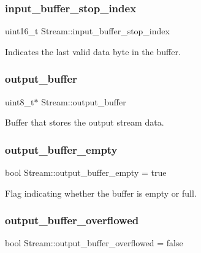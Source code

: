 \subsubsection{\texorpdfstring{input\+\_\+buffer\+\_\+stop\+\_\+index}{input\_buffer\_stop\_index}}
{\footnotesize\ttfamily uint16\+\_\+t Stream\+::input\+\_\+buffer\+\_\+stop\+\_\+index\hspace{0.3cm}{\ttfamily [protected]}}

Indicates the last valid data byte in the buffer. \hypertarget{class_stream_a3cd072a10ad5c1b6308dd2da2cdbec71}{}\label{class_stream_a3cd072a10ad5c1b6308dd2da2cdbec71} 
\subsubsection{\texorpdfstring{output\+\_\+buffer}{output\_buffer}}
{\footnotesize\ttfamily uint8\+\_\+t$\ast$ Stream\+::output\+\_\+buffer\hspace{0.3cm}{\ttfamily [protected]}}

Buffer that stores the output stream data. \hypertarget{class_stream_a54b21caaee0001e44968fb70d0a591f5}{}\label{class_stream_a54b21caaee0001e44968fb70d0a591f5} 
\subsubsection{\texorpdfstring{output\+\_\+buffer\+\_\+empty}{output\_buffer\_empty}}
{\footnotesize\ttfamily bool Stream\+::output\+\_\+buffer\+\_\+empty = true\hspace{0.3cm}{\ttfamily [protected]}}

Flag indicating whether the buffer is empty or full. \hypertarget{class_stream_a149776fead5c56894699da5bfe489b65}{}\label{class_stream_a149776fead5c56894699da5bfe489b65} 
\subsubsection{\texorpdfstring{output\+\_\+buffer\+\_\+overflowed}{output\_buffer\_overflowed}}
{\footnotesize\ttfamily bool Stream\+::output\+\_\+buffer\+\_\+overflowed = false\hspace{0.3cm}{\ttfamily [protected]}}

